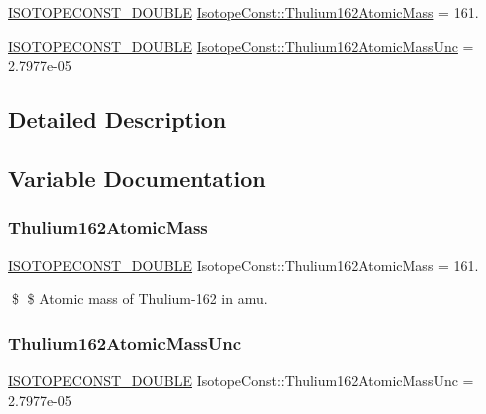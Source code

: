 \begin{DoxyCompactItemize}
\item 
\mbox{\hyperlink{group___isotope_const-_macros_ga8f45a7272ce02c0b4c65c44636ed719a}{I\+S\+O\+T\+O\+P\+E\+C\+O\+N\+S\+T\+\_\+\+D\+O\+U\+B\+LE}} \mbox{\hyperlink{group___isotope_const-_thulium-_tm162_ga73a3c57a040fd49b49cce667ceae3097}{Isotope\+Const\+::\+Thulium162\+Atomic\+Mass}} = 161.
\item 
\mbox{\hyperlink{group___isotope_const-_macros_ga8f45a7272ce02c0b4c65c44636ed719a}{I\+S\+O\+T\+O\+P\+E\+C\+O\+N\+S\+T\+\_\+\+D\+O\+U\+B\+LE}} \mbox{\hyperlink{group___isotope_const-_thulium-_tm162_ga1cebb4189161b805ecfb502e781e725f}{Isotope\+Const\+::\+Thulium162\+Atomic\+Mass\+Unc}} = 2.\+7977e-\/05
\end{DoxyCompactItemize}


\subsection{Detailed Description}


\subsection{Variable Documentation}
\mbox{\label{group___isotope_const-_thulium-_tm162_ga73a3c57a040fd49b49cce667ceae3097}} 
\subsubsection{\texorpdfstring{Thulium162\+Atomic\+Mass}{Thulium162AtomicMass}}
{\footnotesize\ttfamily \mbox{\hyperlink{group___isotope_const-_macros_ga8f45a7272ce02c0b4c65c44636ed719a}{I\+S\+O\+T\+O\+P\+E\+C\+O\+N\+S\+T\+\_\+\+D\+O\+U\+B\+LE}} Isotope\+Const\+::\+Thulium162\+Atomic\+Mass = 161.}

\$ \$ Atomic mass of Thulium-\/162 in amu. \mbox{\label{group___isotope_const-_thulium-_tm162_ga1cebb4189161b805ecfb502e781e725f}} 
\subsubsection{\texorpdfstring{Thulium162\+Atomic\+Mass\+Unc}{Thulium162AtomicMassUnc}}
{\footnotesize\ttfamily \mbox{\hyperlink{group___isotope_const-_macros_ga8f45a7272ce02c0b4c65c44636ed719a}{I\+S\+O\+T\+O\+P\+E\+C\+O\+N\+S\+T\+\_\+\+D\+O\+U\+B\+LE}} Isotope\+Const\+::\+Thulium162\+Atomic\+Mass\+Unc = 2.\+7977e-\/05}

